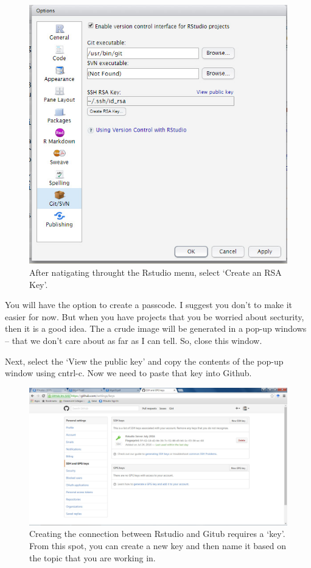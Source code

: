 \documentclass[12pt]{../SOP3_beta}
\begin{document}
\begin{figure}
\includegraphics{graphics/CreatingSSH.jpg}
\caption{After natigating throught the Rstudio menu, select `Create an RSA Key'.}
\end{figure}

\NP You will have the option to create a passcode. I suggest you don't to make it easier for now. But when you have projects that you be worried about secturity, then it is a good idea.
\NP The a crude image will be generated in a pop-up windows -- that we don't care about as far as I can tell. So, close this window. 

\NP Next, select the `View the public key' and copy the contents of the pop-up window using cntrl-c. Now we need to paste that key into Github.

\begin{figure}
\includegraphics{graphics/Github_SavedSSH.jpg}
\caption{Creating the connection between Rstudio and Gitub requires a `key'. From this spot, you can create a new key and then name it based on the topic that you are working in. }
\end{figure}
\end{document}
